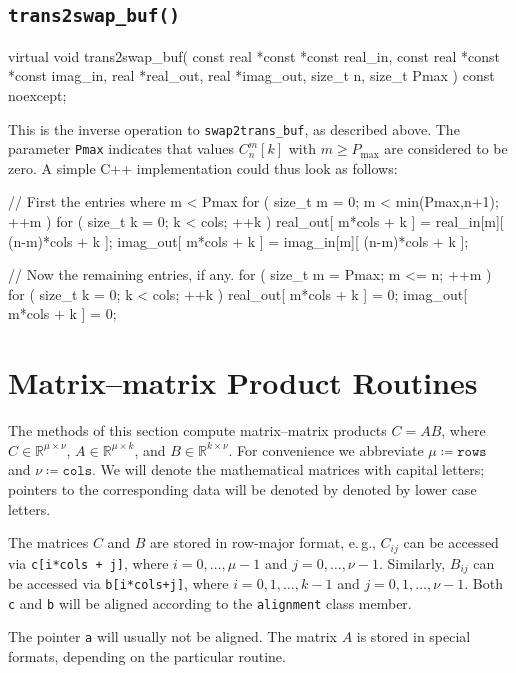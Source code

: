 \documentclass{scrbook}
\newcommand{\reals}{\ensuremath{\mathbb{R}}}
\begin{document}
\subsection{\texorpdfstring{\lstinline|trans2swap_buf()|}{trans2swap_buf}}
\begin{cppcode*}
virtual void trans2swap_buf( const real *const *const real_in, 
                             const real *const *const imag_in,
                                   real *real_out, real *imag_out,
                             size_t n, size_t Pmax ) const noexcept;
\end{cppcode*}
This is the inverse operation to \lstinline|swap2trans_buf|, as
described above. The parameter \lstinline|Pmax| indicates that values
$C_n^m[k]$ with $m\geq P_{\mathrm{max}}$ are considered to be zero. A simple 
C++ implementation could thus look as follows:
\begin{cppcode*}
// First the entries where m < Pmax
for ( size_t m = 0; m < min(Pmax,n+1); ++m )
for ( size_t k = 0; k < cols;          ++k )
{
    real_out[ m*cols + k ] = real_in[m][ (n-m)*cols + k ];
    imag_out[ m*cols + k ] = imag_in[m][ (n-m)*cols + k ];
}

// Now the remaining entries, if any.
for ( size_t m = Pmax; m <= n;    ++m )
for ( size_t k = 0;    k <  cols; ++k )
{
    real_out[ m*cols + k ] = 0;
    imag_out[ m*cols + k ] = 0;
}
\end{cppcode*}


\section{Matrix--matrix Product Routines}
The methods of this section compute matrix--matrix products $C=AB$, where
$C\in\reals^{\mu\times\nu}$, $A\in\reals^{\mu\times k}$, and
$B\in\reals^{k\times\nu}$. For convenience we abbreviate
$\mu\coloneqq\mathtt{rows}$ and $\nu\coloneqq\mathtt{cols}$. We will denote the
mathematical matrices with capital letters; pointers to the corresponding
data will be denoted by denoted by lower case letters.

The matrices $C$ and $B$ are stored in row-major format, e.\,g., $C_{ij}$ can
be accessed via \lstinline|c[i*cols + j]|, where $i=0,\dotsc,\mu-1$ and
$j=0,\dotsc,\nu-1$. Similarly, $B_{ij}$ can be accessed via
\lstinline|b[i*cols+j]|, where $i=0,1,\dotsc,k-1$ and $j=0,1,\dotsc,\nu-1$.
Both \lstinline|c| and \lstinline|b| will be aligned according to the
\lstinline|alignment| class member.

The pointer \lstinline|a| will usually not be aligned. The matrix $A$ is stored
in special formats, depending on the particular routine.
\end{document}
